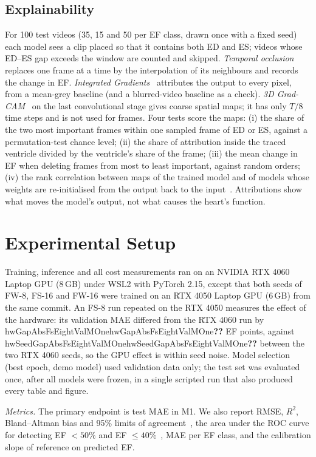\documentclass[conference]{IEEEtran}
\newcommand{\res}[1]{\ifcsname #1\endcsname\csname #1\endcsname\else\textbf{??}\fi}
\begin{document}
\subsection{Explainability}
For 100 test videos (35, 15 and 50 per EF class, drawn once with a fixed seed) each model sees a
clip placed so that it contains both ED and ES; videos whose ED--ES gap exceeds the window are
counted and skipped. \emph{Temporal occlusion} replaces one frame at a time by the interpolation
of its neighbours and records the change in EF. \emph{Integrated
Gradients}~\cite{sundararajan2017axiomatic} attributes the output to every pixel, from a mean-grey
baseline (and a blurred-video baseline as a check). \emph{3D Grad-CAM}~\cite{selvaraju2017gradcam}
on the last convolutional stage gives coarse spatial maps; it has only $T/8$ time steps and is
not used for frames. Four tests score the maps: (i) the share of the two most important frames
within one sampled frame of ED or ES, against a permutation-test chance level; (ii) the share
of attribution inside the traced ventricle divided by the ventricle's share of the frame;
(iii) the mean change in EF when deleting frames from most to least important, against random
orders; (iv) the rank correlation between maps of the trained model and of models whose weights
are re-initialised from the output back to the input~\cite{adebayo2018sanity}. Attributions show
what moves the model's output, not what causes the heart's function.

\section{Experimental Setup}
Training, inference and all cost measurements ran on an NVIDIA RTX 4060 Laptop GPU (8\,GB) under
WSL2 with PyTorch 2.15, except that both seeds of FW-8, FS-16 and FW-16 were trained on an RTX
4050 Laptop GPU (6\,GB) from the same commit. An FS-8 run repeated on the RTX 4050 measures the
effect of the hardware: its validation MAE differed from the RTX 4060 run by
\res{hwGapAbsFsEightValMOne} EF points, against \res{hwSeedGapAbsFsEightValMOne} between the two
RTX 4060 seeds, so the GPU effect is within seed noise. Model selection (best epoch, demo model)
used validation data only; the test set was evaluated once, after all models were frozen, in a
single scripted run that also produced every table and figure.

\emph{Metrics.} The primary endpoint is test MAE in M1. We also report RMSE, $R^2$,
Bland--Altman bias and 95\% limits of agreement~\cite{bland1986statistical}, the area under the
ROC curve for detecting EF $< 50$\% and EF $\le 40$\%~\cite{bozkurt2021universal}, MAE per EF
class, and the calibration slope of reference on predicted EF.
\end{document}
